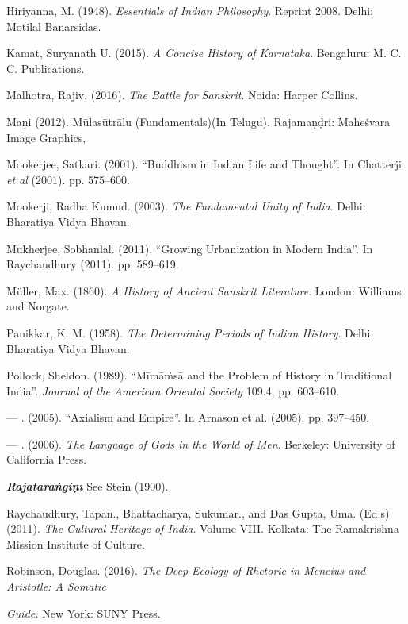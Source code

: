 \begin{thebibliography}{99}
  Hiriyanna, M. (1948). \textit{Essentials of Indian Philosophy}. Reprint 2008. Delhi: Motilal Banarsidas.

  Kamat, Suryanath U. (2015). \textit{A Concise History of Karnataka}. Bengaluru: M. C. C. Publications.

  Malhotra, Rajiv. (2016). \textit{The Battle for Sanskrit}. Noida: Harper Collins.

  Maṇi (2012). Mūlasūtrālu (Fundamentals)(In Telugu). Rajamaṇḍri: Maheśvara Image Graphics,

  Mookerjee, Satkari. (2001). “Buddhism in Indian Life and Thought”. In Chatterji \textit{et al} (2001). pp. 575–600.

  Mookerji, Radha Kumud. (2003). \textit{The Fundamental Unity of India}. Delhi: Bharatiya Vidya Bhavan.

  Mukherjee, Sobhanlal. (2011). “Growing Urbanization in Modern India”. In Raychaudhury (2011). pp. 589–619.

  Müller, Max. (1860). \textit{A History of Ancient Sanskrit Literature}. London: Williams and Norgate.

  Panikkar, K. M. (1958). \textit{The Determining Periods of Indian History}. Delhi: Bharatiya Vidya Bhavan.

  Pollock, Sheldon. (1989). “Mīmāṁsā and the Problem of History in Traditional India”. \textit{Journal of the American Oriental Society} 109.4, pp. 603–610.

  — . (2005). “Axialism and Empire”. In Arnason et al. (2005). pp. 397–450.

  — . (2006). \textit{The Language of Gods in the World of Men}. Berkeley: University of California Press.

  \textbf{\textit{Rājataraṅgiṇī}} See Stein (1900).

  Raychaudhury, Tapan., Bhattacharya, Sukumar., and Das Gupta, Uma. (Ed.s) (2011). \textit{The Cultural Heritage of India}. Volume VIII. Kolkata: The Ramakrishna Mission Institute of Culture.

  Robinson, Douglas. (2016). \textit{The Deep Ecology of Rhetoric in Mencius and Aristotle: A Somatic }

  \textit{ Guide. }New York: SUNY Press.


\end{thebibliography}
